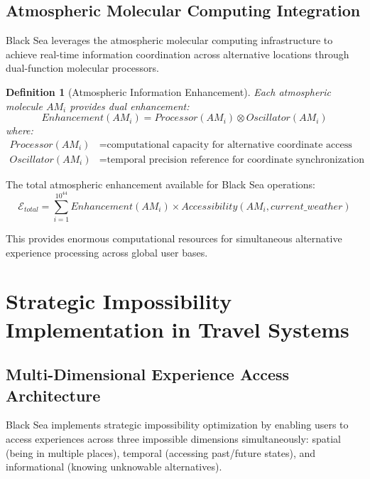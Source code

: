 \documentclass[12pt,a4paper]{article}
\newtheorem{definition}{Definition}
\begin{document}
\subsection{Atmospheric Molecular Computing Integration}

Black Sea leverages the atmospheric molecular computing infrastructure to achieve real-time information coordination across alternative locations through dual-function molecular processors.

\begin{definition}[Atmospheric Information Enhancement]
Each atmospheric molecule $AM_i$ provides dual enhancement:
\begin{equation}
Enhancement(AM_i) = Processor(AM_i) \otimes Oscillator(AM_i)
\end{equation}
where:
\begin{align}
Processor(AM_i) &= \text{computational capacity for alternative coordinate access} \\
Oscillator(AM_i) &= \text{temporal precision reference for coordinate synchronization}
\end{align}
\end{definition}

The total atmospheric enhancement available for Black Sea operations:
\begin{equation}
\mathcal{E}_{total} = \sum_{i=1}^{10^{44}} Enhancement(AM_i) \times Accessibility(AM_i, current\_weather)
\end{equation}

This provides enormous computational resources for simultaneous alternative experience processing across global user bases.

\section{Strategic Impossibility Implementation in Travel Systems}

\subsection{Multi-Dimensional Experience Access Architecture}

Black Sea implements strategic impossibility optimization by enabling users to access experiences across three impossible dimensions simultaneously: spatial (being in multiple places), temporal (accessing past/future states), and informational (knowing unknowable alternatives).
\end{document}
